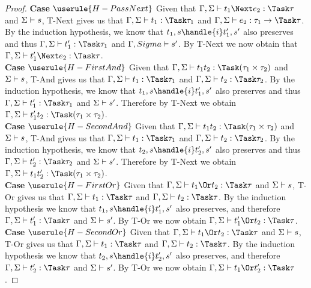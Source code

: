 \begin{proof}
  \noindent\textbf{Case} $\userule{H-PassNext}$ Given that $\Gamma,\Sigma\infers t_1\Next e_2:\Task\tau$ and $\Sigma\vdash s$, T-Next gives us that $\Gamma,\Sigma\infers t_1:\Task\tau_1$ and $\Gamma,\Sigma\infers e_2:\tau_1\to\Task\tau$. By the induction hypothesis, we know that $t_1,s\handle{i}t_1',s'$ also preserves and thus $\Gamma,\Sigma\infers t_1':\Task\tau_1$ and $\Gamma,Sigma\vdash s'$. By T-Next we now obtain that $\Gamma,\Sigma\infers t_1'\Next e_2:\Task\tau$. \\

  \noindent\textbf{Case} $\userule{H-FirstAnd}$ Given that $\Gamma,\Sigma\infers t_1\And t_2:\Task(\tau_1\times\tau_2)$ and $\Sigma\vdash s$, T-And gives us that $\Gamma,\Sigma\infers t_1:\Task\tau_1$ and $\Gamma,\Sigma\infers t_2:\Task\tau_2$. By the induction hypothesis, we know that $t_1,s\handle{i}t_1',s'$ also preserves and thus $\Gamma,\Sigma\infers t_1':\Task\tau_1$ and $\Sigma\vdash s'$. Therefore by T-Next we obtain $\Gamma,\Sigma\infers t_1'\And t_2:\Task(\tau_1\times\tau_2)$.\\

  \noindent\textbf{Case} $\userule{H-SecondAnd}$ Given that $\Gamma,\Sigma\infers t_1\And t_2:\Task(\tau_1\times\tau_2)$ and $\Sigma\vdash s$, T-And gives us that $\Gamma,\Sigma\infers t_1:\Task\tau_1$ and $\Gamma,\Sigma\infers t_2:\Task\tau_2$. By the induction hypothesis, we know that $t_2,s\handle{i}t_2',s'$ also preserves and thus $\Gamma,\Sigma\infers t_2':\Task\tau_2$ and $\Sigma\vdash s'$. Therefore by T-Next we obtain $\Gamma,\Sigma\infers t_1\And t_2':\Task(\tau_1\times\tau_2)$.\\

  \noindent\textbf{Case} $\userule{H-FirstOr}$ Given that $\Gamma,\Sigma\infers t_1\Or t_2:\Task\tau$ and $\Sigma\vdash s$, T-Or gives us that $\Gamma,\Sigma\infers t_1:\Task\tau$ and $\Gamma,\Sigma\infers t_2:\Task\tau$. By the induction hypothesis we know that $t_1,s\handle{i}t_1',s'$ also preserves, and therefore $\Gamma,\Sigma\infers t_1':\Task\tau$ and $\Sigma\vdash s'$. By T-Or we now obtain $\Gamma,\Sigma\infers t_1'\Or t_2:\Task\tau$.\\

  \noindent\textbf{Case} $\userule{H-SecondOr}$ Given that $\Gamma,\Sigma\infers t_1\Or t_2:\Task\tau$ and $\Sigma\vdash s$, T-Or gives us that $\Gamma,\Sigma\infers t_1:\Task\tau$ and $\Gamma,\Sigma\infers t_2:\Task\tau$. By the induction hypothesis we know that $t_2,s\handle{i}t_2',s'$ also preserves, and therefore $\Gamma,\Sigma\infers t_2':\Task\tau$ and $\Sigma\vdash s'$. By T-Or we now obtain $\Gamma,\Sigma\infers t_1\Or t_2':\Task\tau$.
\end{proof}

